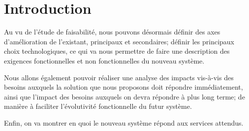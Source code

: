 \section*{Introduction}


Au vu de l'étude de faisabilité, nous pouvons désormais définir
des axes d'amélioration de l'existant, principaux et secondaires;
définir les principaux choix technologiques, ce qui va nous permettre
de faire une description des exigences fonctionnelles et non fonctionnelles
du nouveau système.

Nous allons également pouvoir réaliser une analyse des impacts vis-à-vis
des besoins auxquels la solution que nous proposons doit répondre
immédiatement, ainsi que l'impact des besoins auxquels on devra répondre à
plus long terme; de manière à faciliter l'évolutivité fonctionnelle du
futur système.

Enfin, on va montrer en quoi le nouveau système répond aux services attendus. 
